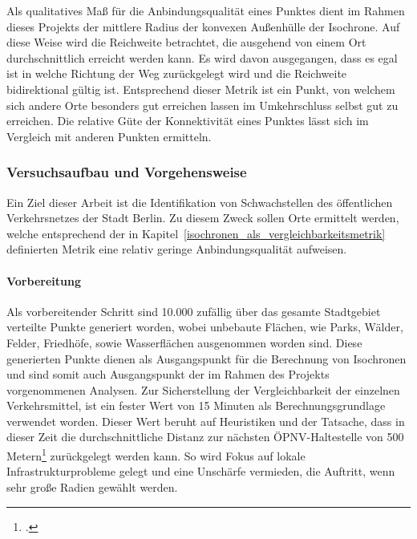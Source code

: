 
Als qualitatives Maß für die Anbindungsqualität eines Punktes dient im Rahmen dieses Projekts der mittlere Radius der konvexen Außenhülle der Isochrone. Auf diese Weise wird die Reichweite betrachtet, die ausgehend von einem Ort durchschnittlich erreicht werden kann. Es wird davon ausgegangen, dass es egal ist in welche Richtung der Weg zurückgelegt wird und die Reichweite bidirektional gültig ist. Entsprechend dieser Metrik ist ein Punkt, von welchem sich andere Orte besonders gut erreichen lassen im Umkehrschluss selbst gut zu erreichen. Die relative Güte der Konnektivität eines Punktes lässt sich im Vergleich mit anderen Punkten ermitteln.

\subsubsection{Versuchsaufbau und Vorgehensweise}
\label{versuchsaufbau_und_vorgehensweise}

Ein Ziel dieser Arbeit ist die Identifikation von Schwachstellen des öffentlichen Verkehrsnetzes der Stadt Berlin. Zu diesem Zweck sollen Orte ermittelt werden, welche entsprechend der in Kapitel~\ref{isochronen_als_vergleichbarkeitsmetrik} definierten Metrik eine relativ geringe Anbindungsqualität aufweisen.

\paragraph*{Vorbereitung}
\label{vorbereitung}

Als vorbereitender Schritt sind 10.000 zufällig über das gesamte Stadtgebiet verteilte Punkte generiert worden, wobei unbebaute Flächen, wie Parks, Wälder, Felder, Friedhöfe, sowie Wasserflächen ausgenommen worden sind. Diese generierten Punkte dienen als Ausgangspunkt für die Berechnung von Isochronen und sind somit auch Ausgangspunkt der im Rahmen des Projekts vorgenommenen Analysen. Zur Sicherstellung der Vergleichbarkeit der einzelnen Verkehrsmittel, ist ein fester Wert von 15 Minuten als Berechnungsgrundlage verwendet worden. Dieser Wert beruht auf Heuristiken und der Tatsache, dass in dieser Zeit die durchschnittliche Distanz zur nächsten ÖPNV-Haltestelle von 500 Metern\footcite{cnb} zurückgelegt werden kann. So wird Fokus auf lokale Infrastrukturprobleme gelegt und eine Unschärfe vermieden, die Auftritt, wenn sehr große Radien gewählt werden.

